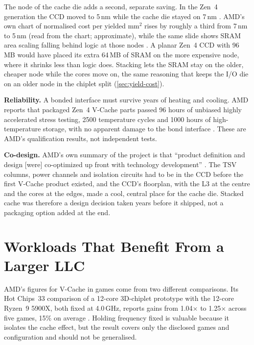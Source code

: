 The node of the cache die adds a second, separate saving. In the Zen~4 generation the CCD moved to 5\,nm while the cache die stayed on 7\,nm \cite{alam2ndGeneration3D2024}. AMD's own chart of normalised cost per yielded mm$^2$ rises by roughly a third from 7\,nm to 5\,nm (read from the chart; approximate), while the same slide shows SRAM area scaling falling behind logic at those nodes \cite[slide~6]{wuu2022vcache}. A planar Zen~4 CCD with 96\,MB would have placed its extra 64\,MB of SRAM on the more expensive node, where it shrinks less than logic does. Stacking lets the SRAM stay on the older, cheaper node while the cores move on, the same reasoning that keeps the I/O die on an older node in the chiplet split (\cref{sec:yield-cost}).

\textbf{Reliability.} A bonded interface must survive years of heating and cooling. AMD reports that packaged Zen~4 V-Cache parts passed 96 hours of unbiased highly accelerated stress testing, 2500 temperature cycles and 1000 hours of high-temperature storage, with no apparent damage to the bond interface \cite[slide~14]{alam2ndGeneration3D2024}. These are AMD's qualification results, not independent tests.

\textbf{Co-design.} AMD's own summary of the project is that ``product definition and design [were] co-optimized up front with technology development'' \cite[slide~33]{wuu2022vcache}. The TSV columns, power channels and isolation circuits had to be in the CCD before the first V-Cache product existed, and the CCD's floorplan, with the L3 at the centre and the cores at the edges, made a cool, central place for the cache die. Stacked cache was therefore a design decision taken years before it shipped, not a packaging option added at the end.

\section{Workloads That Benefit From a Larger LLC}
\label{sec:vcache-workloads}

AMD's figures for V-Cache in games come from two different comparisons. Its Hot Chips~33 comparison of a 12-core 3D-chiplet prototype with the 12-core Ryzen~9 5900X, both fixed at 4.0\,GHz, reports gains from 1.04$\times$ to 1.25$\times$ across five games, 15\% on average \cite[slide~19]{swaminathanAdvancedPackagingEnabling2021}. Holding frequency fixed is valuable because it isolates the cache effect, but the result covers only the disclosed games and configuration and should not be generalised.

